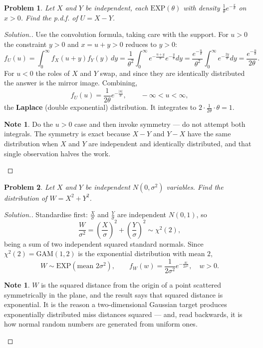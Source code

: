 \documentclass[12pt,a4paper]{report}
\theoremstyle{definition}
\newtheorem{note}[thm]{Note}
\theoremstyle{plain}
\newtheorem{problemx}{Problem}[section]
\newenvironment{problem}{\begin{problemx}}{\end{problemx}}
\newenvironment{solution}
  {\renewcommand{\qedsymbol}{}\begin{proof}[\textit{Solution}.]}
  {\end{proof}}
\begin{document}
\begin{problem}
Let $X$ and $Y$ be independent, each $\text{EXP}(\theta)$ with density
$\frac{1}{\theta}e^{-\frac{x}{\theta}}$ on $x>0$. Find the p.d.f. of $U=X-Y$.
\end{problem}

\begin{solution}
Use the convolution formula, taking care with the support. For $u>0$ the
constraint $y>0$ and $x=u+y>0$ reduces to $y>0$:
\[f_U(u)=\int_0^\infty f_X(u+y)f_Y(y)\,dy
=\frac{1}{\theta^2}\int_0^\infty e^{-\frac{u+y}{\theta}}e^{-\frac{y}{\theta}}dy
=\frac{e^{-\frac{u}{\theta}}}{\theta^2}\int_0^\infty e^{-\frac{2y}{\theta}}dy
=\frac{e^{-\frac{u}{\theta}}}{2\theta}.\]
For $u<0$ the roles of $X$ and $Y$ swap, and since they are identically
distributed the answer is the mirror image. Combining,
\[f_U(u)=\frac{1}{2\theta}e^{-\frac{|u|}{\theta}},\qquad-\infty<u<\infty,\]
the \textbf{Laplace} (double exponential) distribution. It integrates to
$2\cdot\frac{1}{2\theta}\cdot\theta=1$.

\begin{note}
Do the $u>0$ case and then invoke symmetry --- do not attempt both integrals.
The symmetry is exact because $X-Y$ and $Y-X$ have the same distribution when $X$
and $Y$ are independent and identically distributed, and that single observation
halves the work.
\end{note}
\end{solution}

\begin{problem}
Let $X$ and $Y$ be independent $N\left(0,\sigma^2\right)$ variables. Find the
distribution of $W=X^2+Y^2$.
\end{problem}

\begin{solution}
Standardise first: $\frac{X}{\sigma}$ and $\frac{Y}{\sigma}$ are independent
$N(0,1)$, so
\[\frac{W}{\sigma^2}=\left(\frac{X}{\sigma}\right)^2
+\left(\frac{Y}{\sigma}\right)^2\sim\chi^2(2),\]
being a sum of two independent squared standard normals. Since
$\chi^2(2)=\text{GAM}(1,2)$ is the exponential distribution with mean $2$,
\[W\sim\text{EXP}\left(\text{mean }2\sigma^2\right),\qquad
f_W(w)=\frac{1}{2\sigma^2}e^{-\frac{w}{2\sigma^2}},\quad w>0.\]

\begin{note}
$W$ is the squared distance from the origin of a point scattered symmetrically in
the plane, and the result says that squared distance is exponential. It is the
reason a two-dimensional Gaussian target produces exponentially distributed miss
distances squared --- and, read backwards, it is how normal random numbers are
generated from uniform ones.
\end{note}
\end{solution}
\end{document}
